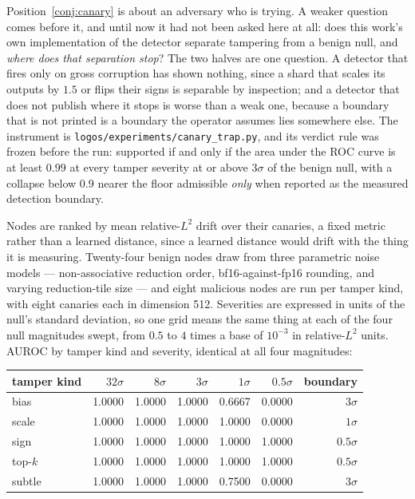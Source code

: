 \documentclass[11pt]{article}
\begin{document}
Position~\ref{conj:canary} is about an adversary who is trying. A weaker question comes before it, and until now it had not been asked here at all: does this work's own implementation of the detector separate tampering from a benign null, and \emph{where does that separation stop}? The two halves are one question. A detector that fires only on gross corruption has shown nothing, since a shard that scales its outputs by $1.5$ or flips their signs is separable by inspection; and a detector that does not publish where it stops is worse than a weak one, because a boundary that is not printed is a boundary the operator assumes lies somewhere else. The instrument is \texttt{logos/experiments/canary\_trap.py}, and its verdict rule was frozen before the run: supported if and only if the area under the ROC curve is at least $0.99$ at every tamper severity at or above $3\sigma$ of the benign null, with a collapse below $0.9$ nearer the floor admissible \emph{only} when reported as the measured detection boundary.

Nodes are ranked by mean relative-$L^2$ drift over their canaries, a fixed metric rather than a learned distance, since a learned distance would drift with the thing it is measuring. Twenty-four benign nodes draw from three parametric noise models --- non-associative reduction order, bf16-against-fp16 rounding, and varying reduction-tile size --- and eight malicious nodes are run per tamper kind, with eight canaries each in dimension 512. Severities are expressed in units of the null's standard deviation, so one grid means the same thing at each of the four null magnitudes swept, from $0.5$ to $4$ times a base of $10^{-3}$ in relative-$L^2$ units. AUROC by tamper kind and severity, identical at all four magnitudes:

\begin{center}
\begin{tabular}{@{}lrrrrrr@{}}
\toprule
tamper kind & $32\sigma$ & $8\sigma$ & $3\sigma$ & $1\sigma$ & $0.5\sigma$ & boundary \\
\midrule
bias   & 1.0000 & 1.0000 & 1.0000 & 0.6667 & 0.0000 & $3\sigma$ \\
scale  & 1.0000 & 1.0000 & 1.0000 & 1.0000 & 0.0000 & $1\sigma$ \\
sign   & 1.0000 & 1.0000 & 1.0000 & 1.0000 & 1.0000 & $0.5\sigma$ \\
top-$k$ & 1.0000 & 1.0000 & 1.0000 & 1.0000 & 1.0000 & $0.5\sigma$ \\
subtle & 1.0000 & 1.0000 & 1.0000 & 0.7500 & 0.0000 & $3\sigma$ \\
\bottomrule
\end{tabular}
\end{center}
\end{document}
